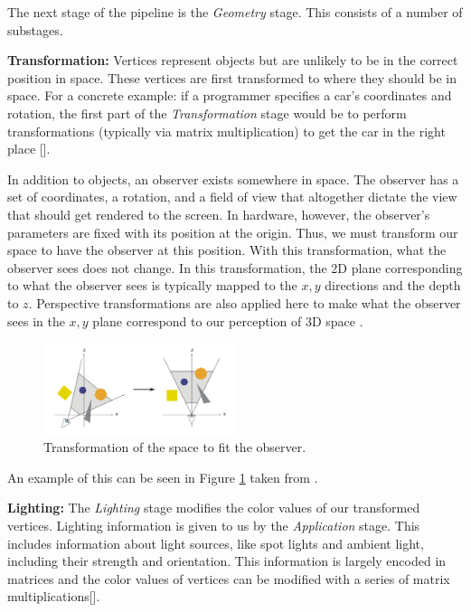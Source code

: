 The next stage of the pipeline is the \textit{Geometry} stage. 
This consists of a number of substages.

\textbf{Transformation:}
Vertices represent objects but are unlikely to be in the correct position in space.
These vertices are first transformed to where they should be in space.
For a concrete example: if a programmer specifies a car's coordinates and
rotation, the first part of the \textit{Transformation} stage would be to perform
transformations (typically via matrix multiplication) to get the car in the
right place [\cite{nvidia256}].

In addition to objects, an observer exists somewhere in space.
The observer has a set of coordinates, a rotation, and a field of view that altogether dictate the view that should get rendered to the screen.
In hardware, however, the observer's parameters are fixed with its position at the origin.
Thus, we must transform our space to have the observer at this position.
With this transformation, what the observer sees does not change.
In this transformation, the 2D plane corresponding to what the observer
sees is typically mapped to the $x,y$ directions and the depth to $z$.
Perspective transformations are also applied here to make what the observer sees in the $x,y$ plane correspond to our perception of 3D space \cite{agoston2005transformations}.

\begin{figure}[h]
    \centering
    \includegraphics[width=0.5\textwidth]{assets/View_transform.png}
    \caption{Transformation of the space to fit the observer.}
    \label{fig:transform}
\end{figure}

An example of this can be seen in Figure \ref{fig:transform} taken from \cite{wiki:Graphics_pipeline}.

\textbf{Lighting:}
The \textit{Lighting} stage modifies the color values of our transformed vertices.
Lighting information is given to us by the \textit{Application} stage.
This includes information about light sources, like spot lights and ambient
light, including their strength and orientation.
This information is largely encoded in matrices and the color values of
vertices can be modified with a series of matrix multiplications[\cite{nvidia256}].

